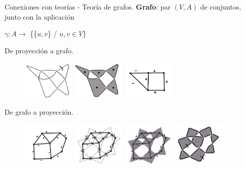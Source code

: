 \documentclass{beamer}
\begin{document}
\begin{frame}{Conexiones con teorías - Teoría de grafos.}
\textbf{Grafo}: par $ (V,A) $ de conjuntos, junto con la aplicación 
\begin{center}
	$  \gamma :A \rightarrow$ \{\{$u,v$\} / $u,v \in V$\}  
\end{center}

\begin{exampleblock}{De proyección a grafo. }
	\begin{figure}[h!]
		\includegraphics[width=2.5cm]{imagenes/pgrafo3.png}
		\includegraphics[width=2.5cm]{imagenes/pgrafo2.png}
		\includegraphics[width=2.5cm]{imagenes/pgrafo1.png}
	\end{figure}
\end{exampleblock}
\begin{exampleblock}{De grafo a proyección. }
	\begin{figure}[h!]
		\includegraphics[width=2.5cm]{imagenes/grafo1.png}
		\includegraphics[width=2.5cm]{imagenes/grafo2.png}
		\includegraphics[width=2.5cm]{imagenes/grafo3.png}
		\includegraphics[width=2.5cm]{imagenes/grafo4.png}
	\end{figure}
\end{exampleblock}
\end{frame}
\end{document}
